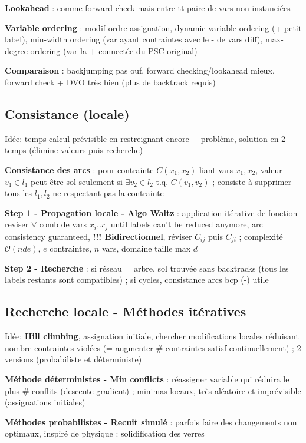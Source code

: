 \textbf{Lookahead} : comme forward check mais entre tt paire de vars non instanciées

\textbf{Variable ordering} : modif ordre assignation, dynamic variable ordering (+ petit label), min-width ordering (var ayant contraintes avec le - de vars diff), max-degree ordering (var la + connectée du PSC original)

\textbf{Comparaison} : backjumping pas ouf, forward checking/lookahead mieux, forward check + DVO très bien (plus de backtrack requis) 


\subsection*{Consistance (locale)}

Idée: temps calcul prévisible en restreignant encore + problème, solution en 2 temps (élimine valeurs puis recherche)

\textbf{Consistance des arcs} : pour contrainte $C(x_1,x_2)$ liant vars $x_1,x_2$, valeur $v_1 \in l_1$ peut être sol seulement si $\exists v_2 \in l_2$ t.q. $C(v_1,v_2)$ ; consiste à supprimer tous les $l_1, l_2$ ne respectant pas la contrainte

\textbf{Step 1 - Propagation locale - Algo Waltz} : application itérative de fonction reviser $\forall$ comb de vars $x_i, x_j$ until labels can't be reduced anymore, arc consistency guaranteed, \textbf{!!! Bidirectionnel}, réviser $C_{ij}$ puis $C_{ji}$ ; complexité $\mathcal{O}(n d e)$, $e$ contraintes, $n$ vars, domaine taille max $d$

\textbf{Step 2 - Recherche} : si réseau = arbre, sol trouvée sans backtracks (tous les labels restants sont compatibles) ; si cycles, consistance arcs bcp (-) utile 



\subsection*{Recherche locale - Méthodes itératives}

Idée: \textbf{Hill climbing}, assignation initiale, chercher modifications locales réduisant nombre contraintes violées (= augmenter \# contraintes satisf continuellement) ; 2 versions (probabiliste et déterministe)

\textbf{Méthode déterministes - Min conflicts} : réassigner variable qui réduira le plus \# conflits (descente gradient) ; minimas locaux, très aléatoire et imprévisible (assignations initiales)

\textbf{Méthodes probabilistes - Recuit simulé} : parfois faire des changements non optimaux, inspiré de physique : solidification des verres

